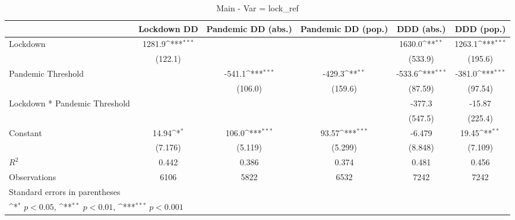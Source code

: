\documentclass{article}
\begin{document}
{
\def\sym#1{\ifmmode^{#1}\else\(^{#1}\)\fi}
\begin{longtable}{l*{5}{c}}
\caption{Main - Var = lock\_ref}\\
\hline\hline\endfirsthead\hline\endhead\hline\endfoot\endlastfoot
                &\multicolumn{1}{c}{Lockdown DD}&\multicolumn{1}{c}{Pandemic DD (abs.)}&\multicolumn{1}{c}{Pandemic DD (pop.)}&\multicolumn{1}{c}{DDD (abs.)}&\multicolumn{1}{c}{DDD (pop.)}\\
\hline
Lockdown        &   1281.9\sym{***}&                  &                  &   1630.0\sym{**} &   1263.1\sym{***}\\
                &  (122.1)         &                  &                  &  (533.9)         &  (195.6)         \\
Pandemic Threshold&                  &   -541.1\sym{***}&   -429.3\sym{**} &   -533.6\sym{***}&   -381.0\sym{***}\\
                &                  &  (106.0)         &  (159.6)         &  (87.59)         &  (97.54)         \\
Lockdown * Pandemic Threshold&                  &                  &                  &   -377.3         &   -15.87         \\
                &                  &                  &                  &  (547.5)         &  (225.4)         \\
Constant        &    14.94\sym{*}  &    106.0\sym{***}&    93.57\sym{***}&   -6.479         &    19.45\sym{**} \\
                &  (7.176)         &  (5.119)         &  (5.299)         &  (8.848)         &  (7.109)         \\
\hline
\(R^{2}\)       &    0.442         &    0.386         &    0.374         &    0.481         &    0.456         \\
Observations    &     6106         &     5822         &     6532         &     7242         &     7242         \\
\hline\hline
\multicolumn{6}{l}{\footnotesize Standard errors in parentheses}\\
\multicolumn{6}{l}{\footnotesize \sym{*} \(p<0.05\), \sym{**} \(p<0.01\), \sym{***} \(p<0.001\)}\\
\end{longtable}
}
\end{document}
